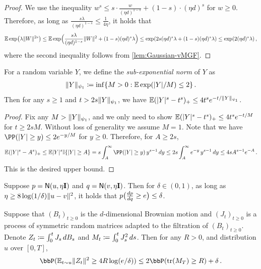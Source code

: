 \begin{proof}
We use the inequality $w^s\leq s\cdot\frac{w}{(\eta d)^{1-s}}+(1-s)\cdot (\eta d)^s$ for $w\geq 0$. Therefore, as long as $\frac{s\lambda}{(\eta d)^{1-s}}\leq \frac{1}{4\eta}$, it holds that
\begin{align*}
    \En\exp\prn*{\lambda\nrm{W}^{2s}}
    \leq \En\exp\prn[\Big]{\frac{s\lambda}{(\eta d)^{1-s}}\nrm{W}^{2}+(1-s)(\eta d)^s\lambda }
    \leq \exp\prn*{2s(\eta d)^s\lambda+(1-s)(\eta d)^s\lambda }
    \leq \exp\prn*{2(\eta d)^s \lambda}\,,
\end{align*}
where the second inequality follows from \cref{lem:Gaussian-vMGF}.
\end{proof}

\newcommand{\nrmexp}[1]{\nrm{#1}_{\psi_1}}
\begin{lemma}\label{lem:sub-exp-trunc}
For a random variable $Y$, we define the \emph{sub-exponential norm} of $Y$ as
\begin{align*}
    \nrmexp{Y}\deq \inf\crl{M>0: \En\exp(\abs{Y}/M)\leq 2}\,.
\end{align*} 
Then for any $s\geq 1$ and $t> 2s\nrmexp{Y}$, we have $\En(\abs{Y}^s-t^s)_+\leq 4t^se^{-t/\nrmexp{Y}}$. 
\end{lemma}
\begin{proof}
Fix any $M>\nrmexp{Y}$, and we only need to show $\En(\abs{Y}^s-t^s)_+\leq 4t^s e^{-t/M}$ for $t\geq 2sM$. Without loss of generality we assume $M=1$.  Note that we have $\PP(\abs{Y}\geq y)\leq 2e^{-y/M}$ for $y\geq 0$. Therefore, for $A\geq 2s$, 
\begin{align*}
    \En(\abs{Y}^s-A^s)_+
    \leq \En\abs{Y}^s \indic\crl{\abs{Y}\geq A}
    =s\int_A^{\infty} \PP(\abs{Y}\geq y)\,y^{s-1}\,dy
    \leq 2s\int_A^{\infty} e^{-y}\,y^{s-1}\,dy\leq 4sA^{s-1}e^{-A}\,.
\end{align*}
This is the desired upper bound. 
\end{proof}

\begin{lemma}\label{lem:Gaussian-Dcov}
Suppose $p=\normal{u,\eta\Id}$ and $q=\normal{v,\eta\Id}$. Then for $\delta\in(0,1)$, as long as $\eta\geq 8\log(1/\delta)\nrm{u-v}^2$, it holds that $p\prn[\big]{\frac{dp}{dq}\geq e}\leq \delta$.
\end{lemma}

\begin{lemma}\label{lem:Ito-Freedman}
    Suppose that $(B_t)_{t\ge 0}$ is the $d$-dimensional Brownian motion and $(J_t)_{t\ge 0}$ is a process of symmetric random matrices adapted to the filtration of $(B_t)_{t\ge 0}$.
Denote $Z_t\deq\int_0^t J_s\, dB_s$ and $M_t\deq \int_0^t J_s^2\,ds$. Then for any $R>0$, and distribution $u$ over $[0,T]$, 
\begin{align*}
    \bbP(\En_{t\sim u}\nrm{Z_t}^2\geq 4R\log(e/\delta))\leq 2\bbP(\tr(M_T)\geq R)+\delta\,.
\end{align*}
\end{lemma}

